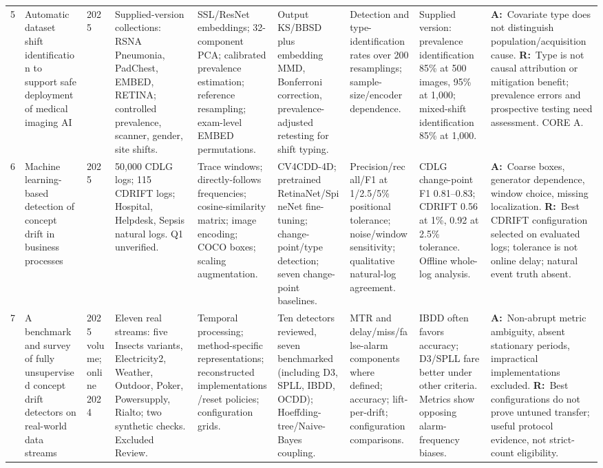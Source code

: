 \documentclass[10pt,a4paper]{article}
\newcommand{\A}{\textbf{A:}\ }
\newcommand{\R}{\textbf{R:}\ }
\begin{document}
\begin{landscape}
\begin{longtable}{L{0.4cm}L{3.55cm}L{0.95cm}L{2.6cm}L{2.7cm}L{2.65cm}L{2.2cm}L{2.4cm}L{4.1cm}}
5 & Automatic dataset shift identification to support safe deployment of medical imaging AI \cite{roschewitz} &
2025 & Supplied-version collections: RSNA Pneumonia, PadChest, EMBED, RETINA; controlled prevalence, scanner, gender, site shifts. &
SSL/ResNet embeddings; 32-component PCA; calibrated prevalence estimation; reference resampling; exam-level EMBED permutations. &
Output KS/BBSD plus embedding MMD, Bonferroni correction, prevalence-adjusted retesting for shift typing. &
Detection and type-identification rates over 200 resamplings; sample-size/encoder dependence. &
Supplied version: prevalence identification 85\% at 500 images, 95\% at 1,000; mixed-shift identification 85\% at 1,000. &
\A Covariate type does not distinguish population/acquisition cause.
\R Type is not causal attribution or mitigation benefit; prevalence errors and prospective testing need assessment. CORE A.\\[4pt]

6 & Machine learning-based detection of concept drift in business processes \cite{kraus} &
2025 & 50,000 CDLG logs; 115 CDRIFT logs; Hospital, Helpdesk, Sepsis natural logs. Q1 unverified. &
Trace windows; directly-follows frequencies; cosine-similarity matrix; image encoding; COCO boxes; scaling augmentation. &
CV4CDD-4D; pretrained RetinaNet/SpineNet fine-tuning; change-point/type detection; seven change-point baselines. &
Precision/recall/F1 at 1/2.5/5\% positional tolerance; noise/window sensitivity; qualitative natural-log agreement. &
CDLG change-point F1 0.81--0.83; CDRIFT 0.56 at 1\%, 0.92 at 2.5\% tolerance. Offline whole-log analysis. &
\A Coarse boxes, generator dependence, window choice, missing localization.
\R Best CDRIFT configuration selected on evaluated logs; tolerance is not online delay; natural event truth absent.\\[4pt]

7 & A benchmark and survey of fully unsupervised concept drift detectors on real-world data streams \cite{lukats} &
2025 volume; online 2024 & Eleven real streams: five Insects variants, Electricity2, Weather, Outdoor, Poker, Powersupply, Rialto; two synthetic checks. Excluded Review. &
Temporal processing; method-specific representations; reconstructed implementations/reset policies; configuration grids. &
Ten detectors reviewed, seven benchmarked (including D3, SPLL, IBDD, OCDD); Hoeffding-tree/Naive-Bayes coupling. &
MTR and delay/miss/false-alarm components where defined; accuracy; lift-per-drift; configuration comparisons. &
IBDD often favors accuracy; D3/SPLL fare better under other criteria. Metrics show opposing alarm-frequency biases. &
\A Non-abrupt metric ambiguity, absent stationary periods, impractical implementations excluded.
\R Best configurations do not prove untuned transfer; useful protocol evidence, not strict-count eligibility.\\[4pt]


\end{longtable}
\end{landscape}
\end{document}
